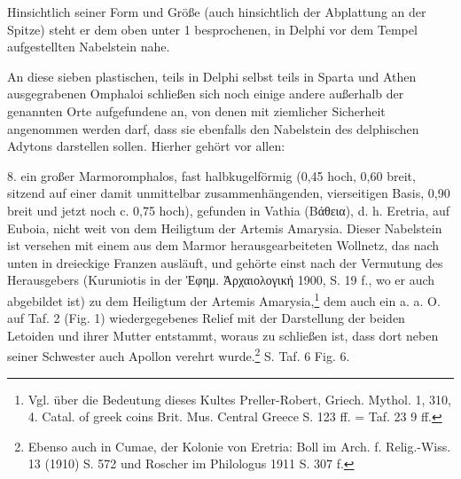 \documentclass[a4paper, 11pt, oneside]{article}
\begin{document}
Hinsichtlich seiner Form und Größe (auch hinsichtlich der Abplattung an der Spitze) steht er dem oben unter 1 besprochenen, in Delphi vor dem Tempel aufgestellten Nabelstein nahe.

An diese sieben plastischen, teils in Delphi selbst teils in Sparta und Athen ausgegrabenen Omphaloi schließen sich noch einige andere außerhalb der genannten Orte aufgefundene an, von denen mit ziemlicher Sicherheit angenommen werden darf, dass sie ebenfalls den Nabelstein des delphischen Adytons darstellen sollen. Hierher gehört vor allen:

8. ein großer Marmoromphalos, fast halbkugelförmig (0,45 hoch, 0,60 breit, sitzend auf einer damit unmittelbar zusammenhängenden, vierseitigen Basis, 0,90 breit und jetzt noch c. 0,75 hoch), gefunden in Vathia (Βάθεια), d. h. Eretria, auf Euboia, nicht weit von dem Heiligtum der Artemis Amarysia. Dieser Nabelstein ist versehen mit einem aus dem Marmor herausgearbeiteten Wollnetz, das nach unten in dreieckige Franzen ausläuft, und gehörte einst nach der Vermutung des Herausgebers (Kuruniotis in der Ἐφημ. Ἀρχαιολογική 1900, S. 19 f., wo er auch abgebildet ist) zu dem Heiligtum der Artemis Amarysia,\footnote{Vgl. über die Bedeutung dieses Kultes Preller-Robert, Griech. Mythol. 1, 310, 4. Catal. of greek coins Brit. Mus. Central Greece S. 123 ff. = Taf. 23 9 ff.} dem auch ein a. a. O. auf Taf. 2 (Fig. 1) wiedergegebenes Relief mit der Darstellung der beiden Letoiden und ihrer Mutter entstammt, woraus zu schließen ist, dass dort neben seiner Schwester auch Apollon verehrt wurde.\footnote{Ebenso auch in Cumae, der Kolonie von Eretria: Boll im Arch. f. Relig.-Wiss. 13 (1910) S. 572 und Roscher im Philologus 1911 S. 307 f.} S. Taf. 6 Fig. 6.
\end{document}

